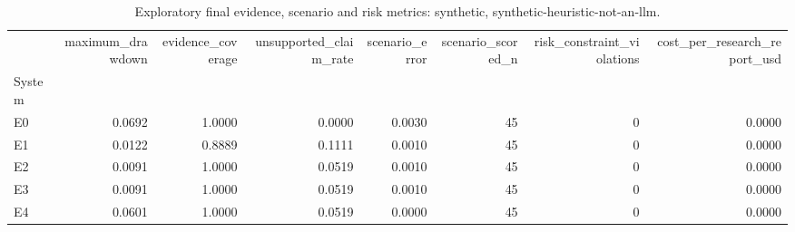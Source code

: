 \begin{table}
\caption{Exploratory final evidence, scenario and risk metrics: synthetic, synthetic-heuristic-not-an-llm.}
\label{tab:investiq-evidence-risk}
\begin{tabular}{lrrrrrrr}
\toprule
 & maximum_drawdown & evidence_coverage & unsupported_claim_rate & scenario_error & scenario_scored_n & risk_constraint_violations & cost_per_research_report_usd \\
System &  &  &  &  &  &  &  \\
\midrule
E0 & 0.0692 & 1.0000 & 0.0000 & 0.0030 & 45 & 0 & 0.0000 \\
E1 & 0.0122 & 0.8889 & 0.1111 & 0.0010 & 45 & 0 & 0.0000 \\
E2 & 0.0091 & 1.0000 & 0.0519 & 0.0010 & 45 & 0 & 0.0000 \\
E3 & 0.0091 & 1.0000 & 0.0519 & 0.0010 & 45 & 0 & 0.0000 \\
E4 & 0.0601 & 1.0000 & 0.0519 & 0.0000 & 45 & 0 & 0.0000 \\
\bottomrule
\end{tabular}
\end{table}
